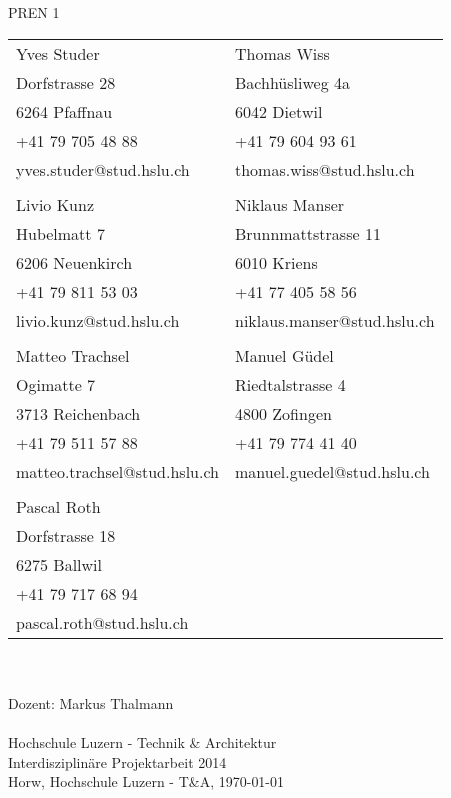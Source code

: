 \begin{titlepage}
    \parindent0pt {\Huge PREN 1}\\
    \vspace*{0.7cm}
    \newline
    \begin{tabular}{ p{6cm} p{5cm}}
        Yves Studer                & Thomas Wiss \\
        Dorfstrasse 28             & Bachhüsliweg 4a \\
        6264 Pfaffnau              & 6042 Dietwil \\
        +41 79 705 48 88           & +41 79 604 93 61 \\
        yves.studer@stud.hslu.ch   & thomas.wiss@stud.hslu.ch \\
                                   & \\
        Livio Kunz                 & Niklaus Manser \\
        Hubelmatt 7                & Brunnmattstrasse 11\\
        6206 Neuenkirch            & 6010 Kriens \\
        +41 79 811 53 03           & +41 77 405 58 56 \\
        livio.kunz@stud.hslu.ch    & niklaus.manser@stud.hslu.ch \\
                                   & \\
        Matteo Trachsel			   & Manuel Güdel \\
        Ogimatte 7                 & Riedtalstrasse 4\\
        3713 Reichenbach           & 4800 Zofingen\\
        +41 79 511 57 88           & +41 79 774 41 40 \\
        matteo.trachsel@stud.hslu.ch & manuel.guedel@stud.hslu.ch \\
        						   & \\
        Pascal Roth			       & \\
        Dorfstrasse 18			   & \\
        6275 Ballwil		       & \\
        +41 79 717 68 94	       & \\
        pascal.roth@stud.hslu.ch   & \\
    \end{tabular}
    \vspace*{1.7cm}
    \newline
    {\Huge \myTitel}\\
    \vspace*{1.2cm}\\
    {\normalsize Dozent: Markus Thalmann}\\
    \vspace*{0.2cm}\\
    {\normalsize Hochschule Luzern - Technik \& Architektur}\\
    {\normalsize Interdisziplinäre Projektarbeit 2014}\\
    \vspace*{2.3cm}
    \newline
    {\normalsize Horw, Hochschule Luzern - T\&A, \today}\\
\end{titlepage}
